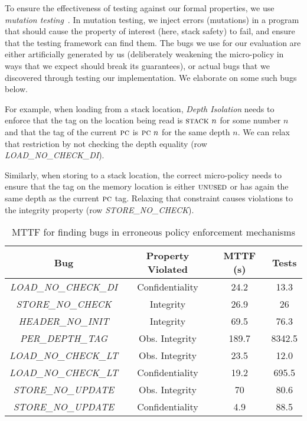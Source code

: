 \documentclass[10pt,conference]{ieeetran}%
\theoremstyle{definition}
\begin{document}
{To ensure the effectiveness of testing against our formal properties, we
use {\em mutation testing}~\cite{JiaH11}. In mutation testing, we inject errors
(mutations) in a program that should cause the property of interest (here,
stack safety) to fail, and ensure that the testing framework can find
them. The bugs we use for our evaluation are either artificially generated
by us (deliberately weakening the micro-policy in ways that we expect
should break its guarantees), or actual bugs that we discovered through
testing our implementation. We elaborate on some such bugs below.

For example, when loading from a stack location, {\em Depth Isolation}
needs to enforce that the tag on the location being read
is $\textsc{stack} ~ n$ for some number $n$ and that the tag of the
current $\textsc{pc}$ is $\textsc{pc} ~ n$ for the same depth $n$. We can relax
that restriction by not checking the depth equality (row {\em
  LOAD\_NO\_CHECK\_DI}).

Similarly, when storing to a stack location, the correct micro-policy
needs to ensure that the tag on the memory location is either
$\textsc{unused}$ or has again the same depth as the current $\textsc{pc}$
tag. Relaxing that constraint causes violations to the integrity
property (row {\em STORE\_NO\_CHECK}).

\begin{table}[]
\centering
\begin{tabular}{c|c|c|c}
  Bug & Property Violated & MTTF (s) & Tests \\
  \hline
      {\em LOAD\_NO\_CHECK\_DI}  & Confidentiality & 24.2 & 13.3 \\
      {\em STORE\_NO\_CHECK} & Integrity & 26.9 & 26 \\
      {\em HEADER\_NO\_INIT} & Integrity & 69.5 & 76.3 \\
  \hline
  \hline
      {\em PER\_DEPTH\_TAG} & Obs. Integrity & 189.7 & 8342.5  \\
      {\em LOAD\_NO\_CHECK\_LT}  & Obs. Integrity & 23.5 & 12.0 \\
      {\em LOAD\_NO\_CHECK\_LT}  & Confidentiality & 19.2 & 695.5 \\
      {\em STORE\_NO\_UPDATE} & Obs. Integrity & 70 & 80.6  \\
      {\em STORE\_NO\_UPDATE} & Confidentiality & 4.9 & 88.5 \\
  \hline
\end{tabular}
\vspace*{1em}
\caption{MTTF for finding bugs in erroneous policy enforcement mechanisms}
\vspace*{-2em}
\label{tab:bug-table}
\end{table}

}
\end{document}
